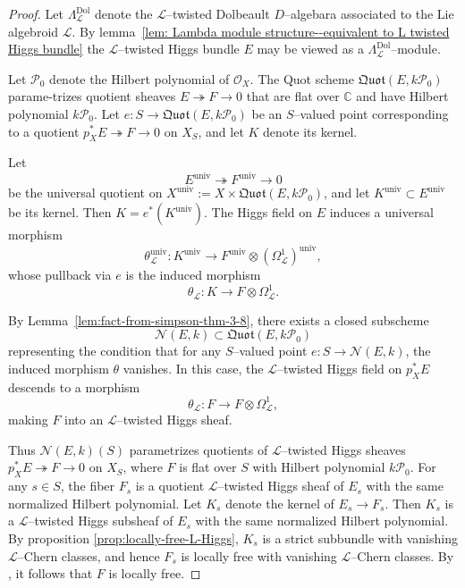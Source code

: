 \documentclass[12pt,reqno]{amsart}
\numberwithin{equation}{subsection}
\theoremstyle{definition}
\theoremstyle{theorem}
\begin{document}
\begin{proof}
	Let $\Lambda^{\text{Dol}}_{\mathcal{L}}$ denote the $\mathcal{L}$--twisted Dolbeault $D$--algebara  associated to the Lie algebroid $\mathcal{L}$.
	By lemma~\eqref{lem: Lambda module structure--equivalent to L twisted Higgs bundle}
	the $\mathcal{L}$--twisted Higgs bundle $E$ may be viewed as a
	$\Lambda^{\mathrm{Dol}}_{\mathcal{L}}$--module.
	
	Let $\mathcal{P}_0$ denote the Hilbert polynomial of $\mathcal{O}_X$.
	The Quot scheme $\mathfrak{Quot}(E,k\mathcal{P}_0)$
	parame-trizes quotient sheaves
	$E \twoheadrightarrow F \to 0$
	that are flat over $\mathbb{C}$ and have Hilbert polynomial
	$k\mathcal{P}_0$.
	Let $e \colon S \to \mathfrak{Quot}(E,k\mathcal{P}_0)$ be an $S$--valued
	point corresponding to a quotient
	$p_X^{*}E \twoheadrightarrow F \to 0$
	on $X_S$, and let $K$ denote its kernel.
	
	Let
	\[
	E^{\mathrm{univ}} \twoheadrightarrow F^{\mathrm{univ}} \to 0
	\]
	be the universal quotient on
	$X^{\mathrm{univ}} := X \times \mathfrak{Quot}(E,k\mathcal{P}_0)$,
	and let $K^{\mathrm{univ}} \subset E^{\mathrm{univ}}$ be its kernel.
	Then $K = e^{*}(K^{\mathrm{univ}})$.
	The Higgs field on $E$ induces a universal morphism
	\[
	\theta_{\mathcal{L}}^{\mathrm{univ}} \colon
	K^{\mathrm{univ}} \longrightarrow
	F^{\mathrm{univ}} \otimes (\Omega^1_{\mathcal{L}})^{\mathrm{univ}},
	\]
	whose pullback via $e$ is the induced morphism
	\[
	\theta_{\mathcal{L}} \colon K \longrightarrow F \otimes \Omega^1_{\mathcal{L}}.
	\]
	
	By Lemma~\eqref{lem:fact-from-simpson-thm-3-8}, there exists a closed
	subscheme
	\[
	\mathcal{N}(E,k) \subset \mathfrak{Quot}(E,k\mathcal{P}_0)
	\]
	representing the condition that for any $S$--valued point
	$e \colon S \to \mathcal{N}(E,k)$,
	the induced morphism $\theta$ vanishes.
	In this case, the $\mathcal{L}$--twisted Higgs field on $p_X^{*}E$ descends to a morphism
	\[
	\theta_{\mathcal{L}} \colon
	F \longrightarrow F \otimes \Omega^1_{\mathcal{L}},
	\]
	making $F$ into an $\mathcal{L}$--twisted Higgs sheaf.
	
	Thus $\mathcal{N}(E,k)(S)$ parametrizes quotients of
	$\mathcal{L}$--twisted Higgs sheaves
	$p_X^{*}E \twoheadrightarrow F \to 0$
	on $X_S$, where $F$ is flat over $S$ with Hilbert polynomial
	$k\mathcal{P}_0$.
	For any $s \in S$, the fiber $F_s$ is a quotient $\mathcal{L}$--twisted Higgs sheaf of $E_s$
	with the same normalized Hilbert polynomial.
	Let $K_s$ denote the kernel of $E_s \to F_s$.
	Then $K_s$ is a $\mathcal{L}$--twisted Higgs subsheaf of $E_s$ with the same normalized Hilbert
	polynomial.
	By proposition \eqref{prop:locally-free-L-Higgs},
	$K_s$ is a strict subbundle with vanishing $\mathcal{L}$--Chern classes, and hence
	$F_s$ is locally free with vanishing $\mathcal{L}$--Chern classes.
	By \cite[\S\,1, Lemma~1.27]{CT.Simpson-1994}, it follows that $F$ is
	locally free.
	

\end{proof}
\end{document}

